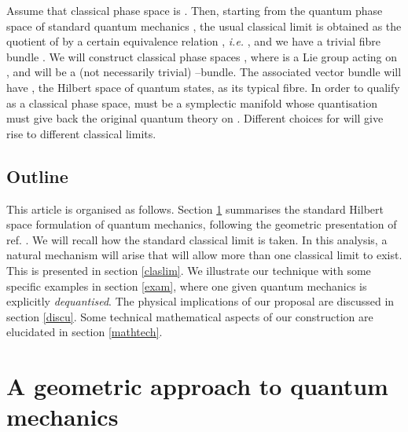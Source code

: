 \documentclass[a4paper,a4paper]{article}
\begin{document}
Assume that classical phase space \coordHE{} is \coordHE{}. Then,
starting from the quantum phase space \coordHE{} of standard quantum mechanics 
\cite{ASHTEKAR}, the usual classical limit \coordHE{} is obtained as the quotient 
of \coordHE{} by a certain equivalence relation \myHighlight{$\sim$}\coordHE{}, {\it i.e.}
\coordHE{},
and we have a trivial fibre bundle \coordHE{}. 
We will construct classical phase spaces \coordHE{}, 
where \coordHE{} is a Lie group acting on \coordHE{}, and \coordHE{} 
will be a (not necessarily trivial) \coordHE{}--bundle. The associated vector 
bundle will have \coordHE{}, the Hilbert space of quantum states, as its 
typical fibre. In order to qualify as a classical 
phase space, \coordHE{} must be a symplectic manifold whose quantisation must give back 
the original quantum theory on \coordHE{}. Different choices for \coordHE{} will give rise to 
different classical limits. 

\subsection{Outline}\label{outl}

This article is organised as follows. Section \ref{ast} summarises the standard Hilbert space 
formulation of quantum mechanics, following the geometric presentation of ref. \cite{ASHTEKAR}. 
We will recall how the standard classical limit \coordHE{} is taken. In this analysis, 
a natural mechanism will arise that will allow more than one classical limit to exist. 
This is presented in section \ref{claslim}. We illustrate our technique with some 
specific examples in section \ref{exam}, where one given quantum mechanics is explicitly 
{\it dequantised}. The physical implications of our proposal are discussed in section \ref{discu}. 
Some technical mathematical aspects of our construction are elucidated in section \ref{mathtech}.
 
\section{A geometric approach to quantum mechanics}\label{ast}
\end{document}

